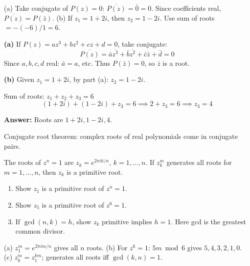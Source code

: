 \vspace{0.5cm}
\begin{hintbox}
(a) Take conjugate of $P(z)=0$: $\overline{P(z)}=\bar{0}=0$. Since coefficients real, $\overline{P(z)}=P(\bar{z})$. (b) If $z_1=1+2i$, then $z_2=1-2i$. Use sum of roots $=-(-6)/1=6$.
\end{hintbox}

\begin{solution}
\textbf{(a)} If $P(z) = az^3+bz^2+cz+d=0$, take conjugate:
$$
\overline{P(z)} = \bar{a}\overline{z^3} + \bar{b}\overline{z^2} + \bar{c}\bar{z} + \bar{d} = 0
$$
Since $a,b,c,d$ real: $\bar{a}=a$, etc. Thus $P(\bar{z})=0$, so $\bar{z}$ is a root.

\textbf{(b)} Given $z_1 = 1+2i$, by part (a): $z_2 = 1-2i$.

Sum of roots: $z_1+z_2+z_3 = 6$
$$
(1+2i)+(1-2i)+z_3 = 6 \implies 2+z_3=6 \implies z_3=4
$$

\textbf{Answer:} Roots are $1+2i, 1-2i, 4$.
\end{solution}

\begin{takeaways}
Conjugate root theorem: complex roots of real polynomials come in conjugate pairs.
\end{takeaways}

\vspace{1cm}

\begin{problem}
The roots of $z^n = 1$ are $z_k = e^{2\pi ik/n}$, $k = 1, \dots, n$. If $z_k^m$ generates all roots for $m=1,\ldots,n$, then $z_k$ is a primitive root.
\begin{enumerate}
    \item Show $z_1$ is a primitive root of $z^n = 1$.
    \item Show $z_5$ is a primitive root of $z^6 = 1$.
    \item If $\gcd(n,k)=h$, show $z_k$ primitive implies $h=1$. Here gcd is the greatest common divisor.
\end{enumerate}
\end{problem}

\vspace{0.5cm}
\begin{hintbox}
(a) $z_1^m = e^{2\pi im/n}$ gives all $n$ roots. (b) For $z^6=1$: $5m \bmod 6$ gives $5,4,3,2,1,0$. (c) $z_k^m=z_1^{km}$; generates all roots iff $\gcd(k,n)=1$.
\end{hintbox}

